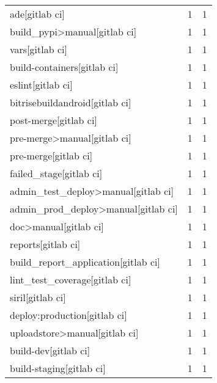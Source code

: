 \begin{tabular}{lrr}
ade[gitlab ci]                             &                   1 &             1 \\
build\_pypi>manual[gitlab ci]               &                   1 &             1 \\
vars[gitlab ci]                            &                   1 &             1 \\
build-containers[gitlab ci]                &                   1 &             1 \\
eslint[gitlab ci]                          &                   1 &             1 \\
bitrisebuildandroid[gitlab ci]             &                   1 &             1 \\
post-merge[gitlab ci]                      &                   1 &             1 \\
pre-merge>manual[gitlab ci]                &                   1 &             1 \\
pre-merge[gitlab ci]                       &                   1 &             1 \\
failed\_stage[gitlab ci]                    &                   1 &             1 \\
admin\_test\_deploy>manual[gitlab ci]        &                   1 &             1 \\
admin\_prod\_deploy>manual[gitlab ci]        &                   1 &             1 \\
doc>manual[gitlab ci]                      &                   1 &             1 \\
reports[gitlab ci]                         &                   1 &             1 \\
build\_report\_application[gitlab ci]        &                   1 &             1 \\
lint\_test\_coverage[gitlab ci]              &                   1 &             1 \\
siril[gitlab ci]                           &                   1 &             1 \\
deploy:production[gitlab ci]               &                   1 &             1 \\
uploadstore>manual[gitlab ci]              &                   1 &             1 \\
build-dev[gitlab ci]                       &                   1 &             1 \\
build-staging[gitlab ci]                   &                   1 &             1 \\

\end{tabular}
